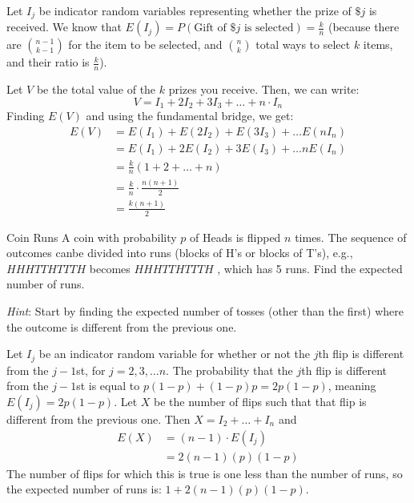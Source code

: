 \documentclass[11pt]{article}
\begin{document}
\begin{solution}{1.5}
Let $I_j$ be indicator random variables representing whether the prize of $\$j$ is received. We know that $E(I_j) = P(\text{Gift of \$$j$ is selected}) = \frac{k}{n}$ (because there are ${n-1 \choose k-1}$ for the item to be selected, and ${n \choose k}$ total ways to select $k$ items, and their ratio is $\frac{k}{n}$). 

Let $V$ be the total value of the $k$ prizes you receive. Then, we can write: 
$$ V = I_1 + 2 I_2 + 3 I_3 + \ldots + n \cdot I_n$$ 
Finding $E(V)$ and using the fundamental bridge, we get: 
\begin{align*}
E(V) &= E(I_1) + E(2 I_2) + E(3 I_3) + \ldots E(n I_n) \\
&= E(I_1) + 2 E(I_2) + 3 E(I_3) + \ldots n E(I_n) \\ 
&= \frac{k}{n} \left( 1 +2 + \ldots + n \right) \\ 
&= \frac{k}{n} \cdot \frac{n(n+1)}{2} \\
&= \boxed{\frac{k(n+1)}{2}}
\end{align*} 

\end{solution}

\begin{exercise}{Coin Runs}
A coin with probability $p$ of Heads is flipped $n$ times. The sequence of outcomes canbe divided into runs (blocks of H's or blocks of T's), e.g., $HHHTTHTTTH$ becomes $\boxed{HHH}\boxed{TT}\boxed{H}\boxed{TTT}\boxed{H}$ , which has 5 runs. Find the expected number of runs.

\textit{Hint}: Start by finding the expected number of tosses (other than the first) where the outcome is different from the previous one.
\end{exercise}
\begin{solution}{1.75}
Let $I_j$ be an indicator random variable for whether or not the $j$th flip is different from the $j-1$st, for $j = 2, 3, \ldots n$. The probability that the $j$th flip is different from the $j-1$st is equal to $p(1-p) + (1-p)p = 2p(1-p)$, meaning $E(I_j) = 2p(1-p)$. Let $X$ be the number of flips such that that flip is different from the previous one. Then $X = I_2 + \ldots + I_n$ and 
\begin{align*}
E(X) &= (n-1) \cdot E(I_j) \\ 
&= 2(n-1)(p)(1-p)
\end{align*}
The number of flips for which this is true is one less than the number of runs, so the expected number of runs is: $\boxed{1 + 2(n-1)(p)(1-p)}$. 
\end{solution}
\end{document}
